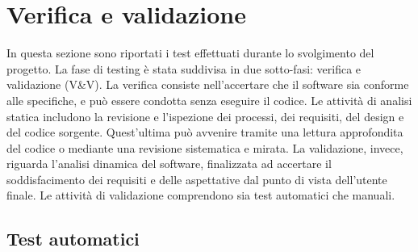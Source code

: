 \chapter{Verifica e validazione}
\label{cap:verifica-validazione}

\par In questa sezione sono riportati i test effettuati durante lo svolgimento del progetto. La fase di testing è stata suddivisa in due sotto-fasi: verifica e validazione (V\&V). La verifica consiste nell’accertare che il software sia conforme alle specifiche, e può essere condotta senza eseguire il codice. Le attività di analisi statica includono la revisione e l’ispezione dei processi, dei requisiti, del design e del codice sorgente. Quest’ultima può avvenire tramite una lettura approfondita del codice o mediante una revisione sistematica e mirata. La validazione, invece, riguarda l’analisi dinamica del software, finalizzata ad accertare il soddisfacimento dei requisiti e delle aspettative dal punto di vista dell’utente finale. Le attività di validazione comprendono sia test automatici che manuali.

\section{Test automatici}